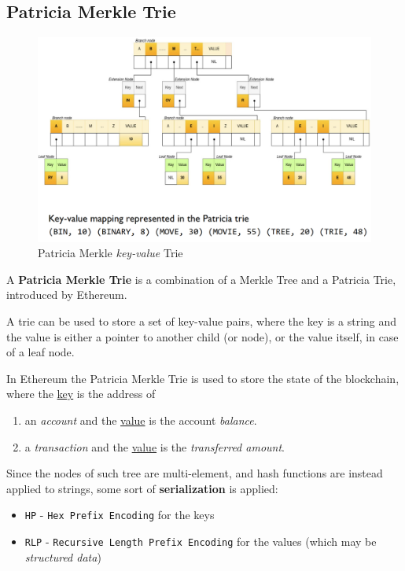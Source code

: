 \subsection{Patricia Merkle Trie}

\begin{figure}[htbp]
   \centering
   \includegraphics{images/patriciaMerkle.png}
   \caption{Patricia Merkle \textit{key-value} Trie}
   \label{fig:patriciaMerkle}
\end{figure}
A \textbf{Patricia Merkle Trie} is a combination of a Merkle Tree and a Patricia Trie, introduced by Ethereum.

A trie can be used to store a set of key-value pairs, where the key is a string and the value is either a pointer to another child (or node), or the value itself, in case of a leaf node.

In Ethereum the Patricia Merkle Trie is used to store the state of the blockchain, where the \ul{key} is the address of
\begin{enumerate}
   \item an \textit{account} and the \ul{value} is the account \textit{balance}.
   \item a \textit{transaction} and the \ul{value} is the \textit{transferred amount}.
\end{enumerate}

Since the nodes of such tree are multi-element, and hash functions are instead applied to strings, some sort of \textbf{serialization} is applied:
\begin{itemize}
   \item \texttt{HP} - \texttt{Hex Prefix Encoding} for the keys
   \item \texttt{RLP} - \texttt{Recursive Length Prefix Encoding} for the values (which may be \textit{structured data})
\end{itemize}

